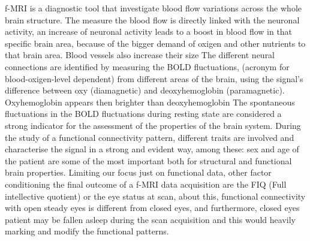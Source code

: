 \documentclass[a4paper,11pt]{article}
\begin{document}
f-MRI is a diagnostic tool that investigate blood flow variations across the whole brain structure.
The measure the blood flow is directly linked with the neuronal activity, an increase of neuronal activity leads to a boost in blood flow in that specific brain area, because of the bigger demand of oxigen and other nutrients to that brain area.
Blood vessels also increase their size
The different neural connections are identified by measuring the BOLD fluctuations, (acronym for blood-oxigen-level dependent) from different areas of the brain, using the signal's difference between oxy (diamagnetic) and deoxyhemoglobin (paramagnetic).
Oxyhemoglobin appears then brighter than deoxyhemoglobin
The spontaneous fluctuations in the BOLD fluctuations during resting state are considered a strong indicator for the assessment of the properties of the brain system.
During the study of a functional connectivity pattern, different traits are involved and characterise the signal in a strong and evident way, among these: sex and age of the patient are some of the most important both for structural and functional brain properties.
Limiting our focus just on functional data, other factor conditioning the final outcome of a f-MRI data acquisition are the FIQ (Full intellective quotient) or the eye status at scan, about this, functional connectivity with open steady eyes is different from closed eyes, and furthermore, closed eyes patient may be fallen asleep during the scan acquisition and this would heavily marking and modify the functional patterns.
\end{document}
